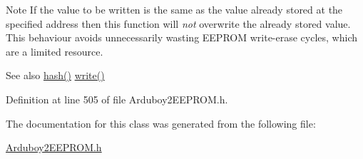 \begin{DoxyNote}{Note}
If the value to be written is the same as the value already stored at the specified address then this function will {\itshape not} overwrite the already stored value. This behaviour avoids unnecessarily wasting E\+E\+P\+R\+OM write-\/erase cycles, which are a limited resource.
\end{DoxyNote}
\begin{DoxySeeAlso}{See also}
\mbox{\hyperlink{classArduboy2EEPROM_a0d81ac363020a75a0b56af7eb014f5b4}{hash()}} \mbox{\hyperlink{classArduboy2EEPROM_abf7be1f27f4815de59257210dac8c9eb}{write()}} 
\end{DoxySeeAlso}


Definition at line 505 of file Arduboy2\+E\+E\+P\+R\+O\+M.\+h.



The documentation for this class was generated from the following file\+:\begin{DoxyCompactItemize}
\item 
\mbox{\hyperlink{Arduboy2EEPROM_8h}{Arduboy2\+E\+E\+P\+R\+O\+M.\+h}}\end{DoxyCompactItemize}
